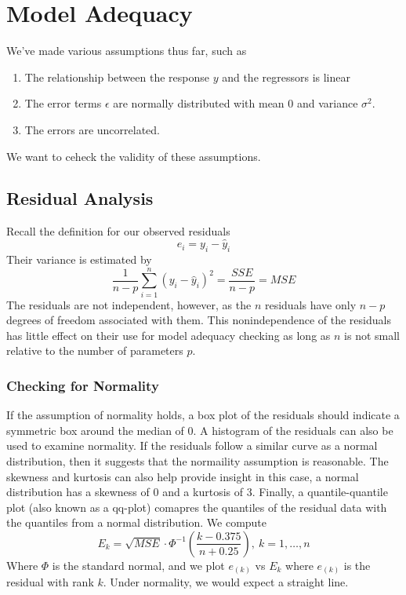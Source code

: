 \chapter{Model Adequacy}

We've made various assumptions thus far, such as 
\begin{enumerate}
    \item The relationship between the response $y$ and the regressors is linear
    \item The error terms $\epsilon$ are normally distributed with mean 0 and variance $\sigma^2$.
    \item The errors are uncorrelated.
\end{enumerate}
\noindent
We want to ceheck the validity of these assumptions.
\section{Residual Analysis}
Recall the definition for our observed residuals 
\[e_i = y_i - \hat{y}_i\]
Their variance is estimated by 
\[\frac{1}{n-p}\sum_{i=1}^n (y_i - \hat{y}_i)^2 = \frac{SSE}{n-p} = MSE\]
The residuals are not independent, however, as the $n$ residuals have only $n - p$
degrees of freedom associated with them. This nonindependence of the residuals
has little effect on their use for model adequacy checking as long as $n$ is not small
relative to the number of parameters $p$.

\subsection{Checking for Normality}

If the assumption of normality holds, a box plot of the residuals should indicate a symmetric box around the median of 0. A histogram of the residuals can also be used to examine normality. If the residuals follow a similar curve as a normal distribution, then it suggests that the normaility assumption is reasonable. The skewness and kurtosis can also help provide insight in this case, a normal distribution has a skewness of 0 and a kurtosis of 3. Finally, a quantile-quantile plot (also known as a qq-plot) comapres the quantiles of the residual data with the quantiles from a normal distribution. We compute 
\[E_k = \sqrt{MSE}\cdot\Phi^{-1}\left(\frac{k-0.375}{n + 0.25}\right), \ k = 1, \ldots , n\]
Where $\Phi$ is the standard normal, and we plot $e_{(k)}$ vs $E_k$ where $e_{(k)}$ is the residual with rank $k$. Under normality, we would expect a straight line.

